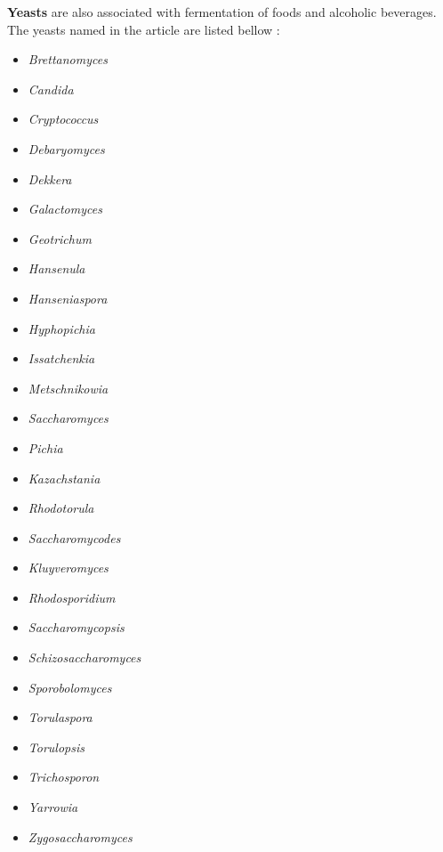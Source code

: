 \textbf{Yeasts} are also associated with fermentation of foods and alcoholic beverages. The yeasts named in the article are listed bellow \cite*{L1-DiversityMicro}:
\begin{highlight}
    \begin{multicols}{4}
        \begin{itemize}
            \item \textit{Brettanomyces}
            \item \textit{Candida}
            \item \textit{Cryptococcus}
            \item \textit{Debaryomyces}
            \item \textit{Dekkera}
            \item \textit{Galactomyces}
            \item \textit{Geotrichum}
            \item \textit{Hansenula}
            \item \textit{Hanseniaspora}
            \item \textit{Hyphopichia}
            \item \textit{Issatchenkia}
            \item \textit{Metschnikowia}
            \item \textit{Saccharomyces}
            \item \textit{Pichia}
            \item \textit{Kazachstania}
            \item \textit{Rhodotorula}
            \item \textit{Saccharomycodes}
            \item \textit{Kluyveromyces}
            \item \textit{Rhodosporidium}
            \item \textit{Saccharomycopsis}
            \item \textit{Schizosaccharomyces}
            \item \textit{Sporobolomyces}
            \item \textit{Torulaspora}
            \item \textit{Torulopsis}
            \item \textit{Trichosporon}
            \item \textit{Yarrowia}
            \item \textit{Zygosaccharomyces}                  
        \end{itemize}
    \end{multicols}
\end{highlight}

